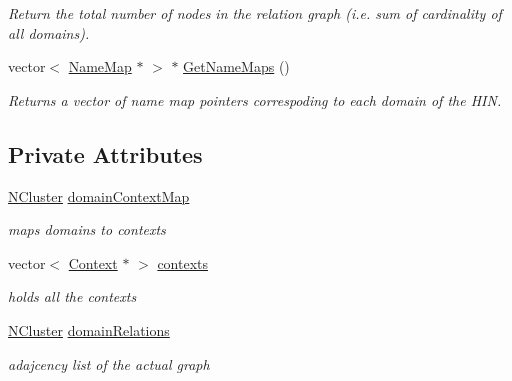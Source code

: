\begin{DoxyCompactItemize}
\begin{DoxyCompactList}\small\item\em Return the total number of nodes in the relation graph (i.e. sum of cardinality of all domains). \item\end{DoxyCompactList}\item 
vector$<$ \hyperlink{class_name_map}{NameMap} $\ast$ $>$ $\ast$ \hyperlink{class_relation_graph_a79d93b2f1cb9226aa4a3fcbbe423588b}{GetNameMaps} ()
\begin{DoxyCompactList}\small\item\em Returns a vector of name map pointers correspoding to each domain of the HIN. \item\end{DoxyCompactList}\end{DoxyCompactItemize}
\subsection*{Private Attributes}
\begin{DoxyCompactItemize}
\item 
\hypertarget{class_relation_graph_a19682ef9117675a560dc472ccd8ed71e}{
\hyperlink{class_n_cluster}{NCluster} \hyperlink{class_relation_graph_a19682ef9117675a560dc472ccd8ed71e}{domainContextMap}}
\label{class_relation_graph_a19682ef9117675a560dc472ccd8ed71e}

\begin{DoxyCompactList}\small\item\em maps domains to contexts \item\end{DoxyCompactList}\item 
\hypertarget{class_relation_graph_a5332e76684098cd29d56cb4bd61ad006}{
vector$<$ \hyperlink{class_context}{Context} $\ast$ $>$ \hyperlink{class_relation_graph_a5332e76684098cd29d56cb4bd61ad006}{contexts}}
\label{class_relation_graph_a5332e76684098cd29d56cb4bd61ad006}

\begin{DoxyCompactList}\small\item\em holds all the contexts \item\end{DoxyCompactList}\item 
\hypertarget{class_relation_graph_ae9f10cd7d1c80a5c6860efb3155a3737}{
\hyperlink{class_n_cluster}{NCluster} \hyperlink{class_relation_graph_ae9f10cd7d1c80a5c6860efb3155a3737}{domainRelations}}
\label{class_relation_graph_ae9f10cd7d1c80a5c6860efb3155a3737}

\begin{DoxyCompactList}\small\item\em adajcency list of the actual graph \item\end{DoxyCompactList}\end{DoxyCompactItemize}


